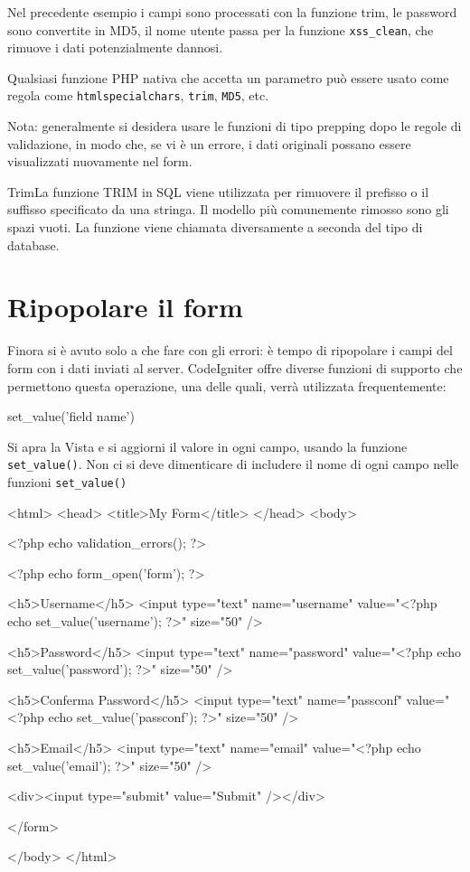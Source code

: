 Nel precedente esempio i campi sono processati con la funzione trim, le password sono convertite in MD5, il nome utente passa per la funzione \verb|xss_clean|, che rimuove i dati potenzialmente dannosi.

Qualsiasi funzione \ac{PHP} nativa che accetta un parametro può essere usato come regola come \verb|htmlspecialchars|, \verb|trim|, \verb|MD5|, etc.

Nota: generalmente si desidera usare le funzioni di tipo prepping dopo le regole di validazione, in modo che, se vi è un errore, i dati originali possano essere visualizzati nuovamente nel form.

\begin{deftabv}{Trim}{La funzione TRIM in SQL viene utilizzata per rimuovere il prefisso o il suffisso specificato da una stringa. Il modello più comunemente rimosso sono gli spazi vuoti. La funzione viene chiamata diversamente a seconda del tipo di database.}
\end{deftabv}

\section*{Ripopolare il form}
Finora si è avuto solo a che fare con gli errori: è tempo di ripopolare i campi del form con i dati inviati al server. CodeIgniter offre diverse funzioni di supporto che permettono questa operazione, una delle quali, verrà utilizzata frequentemente:

\begin{code}
set_value('field name')
\end{code}

Si apra la Vista  e si aggiorni il valore in ogni campo, usando la funzione \verb|set_value()|. Non ci si deve dimenticare di includere il nome di ogni campo nelle funzioni \verb|set_value()|

\begin{html}
<html>
<head>
<title>My Form</title>
</head>
<body>

<?php echo validation_errors(); ?>

<?php echo form_open('form'); ?>

<h5>Username</h5>
<input type="text" name="username" value="<?php echo set_value('username'); ?>" size="50" />

<h5>Password</h5>
<input type="text" name="password" value="<?php echo set_value('password'); ?>" size="50" />

<h5>Conferma Password</h5>
<input type="text" name="passconf" value="<?php echo set_value('passconf'); ?>" size="50" />

<h5>Email</h5>
<input type="text" name="email" value="<?php echo set_value('email'); ?>" size="50" />

<div><input type="submit" value="Submit" /></div>

</form>

</body>
</html>
\end{html}

